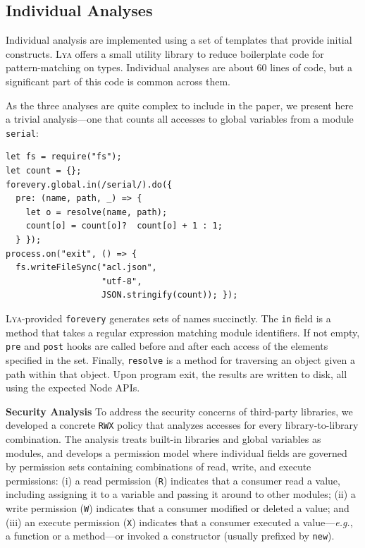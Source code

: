 \documentclass[letterpaper,twocolumn,10pt]{article}
\def\eg{{\em e.g.}, }
\newcommand{\heading}[1]{\vspace{2pt}\noindent\textbf{#1}\enspace}
\newcommand{\ttt}[1]{\texttt{#1}}
\newcommand{\sx}[1]{(\S\ref{#1})}
\newcommand{\sys}{{\scshape Lya}\xspace}
\newcommand{\R}{\ttt{R}\xspace}
\newcommand{\W}{\ttt{W}\xspace}
\newcommand{\X}{\ttt{X}\xspace}
\begin{document}
\subsection{Individual Analyses}
\label{impl2}

Individual analysis are implemented using a set of templates that provide initial constructs.
\sys offers a small utility library to reduce boilerplate code for pattern-matching on types.
Individual analyses are about 60 lines of code, but a significant part of this code is common across them.

As the three analyses are quite complex to include in the paper, we present here a trivial analysis---one that counts all accesses to global variables from a module \ttt{serial}:

\begin{lstlisting}
let fs = require("fs");
let count = {};
forevery.global.in(/serial/).do({
  pre: (name, path, _) => {
    let o = resolve(name, path);
    count[o] = count[o]?  count[o] + 1 : 1;
  } });
process.on("exit", () => {
  fs.writeFileSync("acl.json",
                   "utf-8",
                   JSON.stringify(count)); });
\end{lstlisting}

\noindent
\sys-provided \ttt{forevery} generates sets of names succinctly.
The \ttt{in} field is a method that takes a regular expression matching module identifiers.
If not empty, \ttt{pre} and \ttt{post} hooks are called before and after each access of the elements specified in the set.
Finally, \ttt{resolve} is a method for traversing an object given a path within that object.
Upon program exit, the results are written to disk, all using the expected Node APIs.

\heading{Security Analysis}
To address the security concerns of third-party libraries, we developed a concrete \ttt{RWX} policy that analyzes accesses for every library-to-library combination.
The analysis treats built-in libraries and global variables as modules,
and develops a permission model where individual fields are governed by permission sets containing combinations of read, write, and execute permissions:
 (i) a read permission (\R) indicates that a consumer read a value, including assigning it to a variable and passing it around to other modules;
 (ii) a write permission (\W) indicates that a consumer modified or deleted a value; and
 (iii)  an execute permission (\X) indicates that a consumer executed a value---\eg a function or a method---or invoked a constructor (usually prefixed by \ttt{new}).
\end{document}
